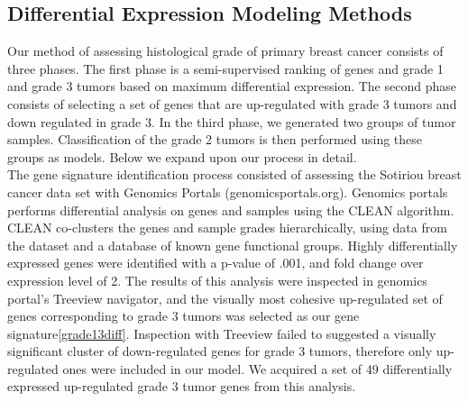 \documentclass[a4paper,10pt]{article}
\begin{document}
\subsection{Differential Expression Modeling Methods}
Our method of assessing histological grade of primary breast cancer consists of three phases. The first phase is
a semi-supervised ranking of genes and grade 1 and grade 3 tumors based on maximum differential
expression. The second phase consists of selecting a set of genes that are up-regulated with 
grade 3 tumors and down regulated in grade 3. In the third phase, we generated two groups of tumor samples.
Classification of the grade 2 tumors is then performed using these groups as models. Below we expand upon
our process in detail.\\
The gene signature identification process consisted of assessing the Sotiriou breast cancer data set with Genomics Portals (genomicsportals.org).
Genomics portals performs differential analysis on genes and samples using the CLEAN algorithm\cite{CLEAN}. CLEAN co-clusters
the genes and sample grades hierarchically, using data from the dataset and a database of known gene functional groups. Highly differentially
expressed genes were identified with a p-value of .001, and fold change over expression level of 2. The results of this analysis
were inspected in genomics portal's Treeview navigator\cite{Treeview}, and the visually most cohesive up-regulated set of genes
corresponding to grade 3 tumors was selected as our gene signature\ref{grade13diff}. Inspection with Treeview failed to suggested a 
visually significant cluster of down-regulated genes for grade 3 tumors, therefore only up-regulated ones were included in our model. 
We acquired a set of 49 differentially expressed up-regulated grade 3 tumor genes from this analysis.\\
\end{document}
